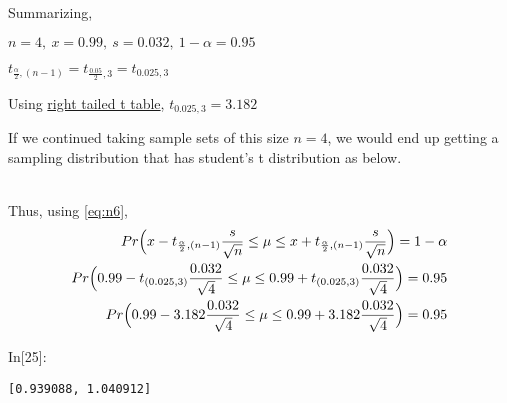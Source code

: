 \documentclass[float=false,crop=false]{standalone}
\begin{document}
    Summarizing,

\(n = 4, \ x = 0.99, \ s = 0.032, \ 1-\alpha = 0.95\)

\(t_{\frac{\alpha}{2},(n-1)} = t_{\frac{0.05}{2},3} = t_{0.025,3}\)

Using
\href{http://pages.stat.wisc.edu/~ifischer/Intro_Stat/Lecture_Notes/APPENDIX/A5._Statistical_Tables/A5.2_-_t-distribution.pdf}{right
tailed t table}, \(t_{0.025,3} = 3.182\)

If we continued taking sample sets of this size \(n=4\), we would end up
getting a sampling distribution that has student's t distribution as
below.
    \begin{center}
    \end{center}
    { \hspace*{\fill} \\}
    Thus, using \ref{eq:n6}, 
    \[
\begin{aligned}
    Pr\Big( x - t_{\frac{\alpha}{2},(n-1)}\frac{s}{\sqrt{n}} \leq \mu \leq x + t_{\frac{\alpha}{2},(n-1)}\frac{s}{\sqrt{n}}\Big) = 1-\alpha \nonumber \\
    Pr\Big( 0.99 - t_{(0.025,3)}\frac{0.032}{\sqrt{4}} \leq \mu \leq 0.99 + t_{(0.025,3)}\frac{0.032}{\sqrt{4}}\Big) = 0.95 \nonumber \\
    Pr\Big( 0.99 - 3.182\frac{0.032}{\sqrt{4}} \leq \mu \leq 0.99 + 3.182\frac{0.032}{\sqrt{4}}\Big) = 0.95
\end{aligned} \nonumber \\
\]
\begin{InVerbatim}[commandchars=\\\{\},fontsize=\scriptsize]
{\color{incolor}In[{\color{incolor}25}]:}     
                
               
              \PY{p}{[}\PY{p}{]}
         
           
            
\end{InVerbatim}
    \begin{Verbatim}[commandchars=\\\{\},fontsize=\footnotesize]
[0.939088, 1.040912]

    \end{Verbatim}
\end{document}
